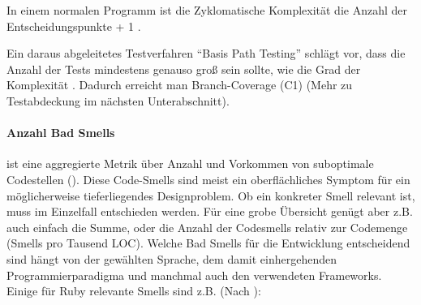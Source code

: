 
In einem normalen Programm ist die Zyklomatische Komplexität die Anzahl der Entscheidungspunkte + 1 \citep[S. 314]{mccabe_complexity_1976}.

Ein daraus abgeleitetes Testverfahren "`Basis Path Testing"' schlägt vor, dass die Anzahl der Tests mindestens genauso groß sein sollte, wie die Grad der Komplexität \citep[S. 318]{mccabe_complexity_1976}. Dadurch erreicht man Branch-Coverage (C1) (Mehr zu Testabdeckung im nächsten Unterabschnitt).

\paragraph{Anzahl Bad Smells} ist eine aggregierte Metrik über Anzahl und Vorkommen von suboptimale Codestellen (). Diese Code-Smells sind meist ein oberflächliches Symptom für ein möglicherweise tieferliegendes Designproblem. Ob ein konkreter Smell relevant ist, muss im Einzelfall entschieden werden. Für eine grobe Übersicht genügt aber z.B. auch einfach die Summe, oder die Anzahl der Codesmells relativ zur Codemenge (Smells pro Tausend LOC). Welche Bad Smells für die Entwicklung entscheidend sind hängt von der gewählten Sprache, dem damit einhergehenden Programmierparadigma und manchmal auch den verwendeten Frameworks. Einige für Ruby relevante Smells sind z.B. (Nach \citep{kevin_rutherford_code_2010}):


